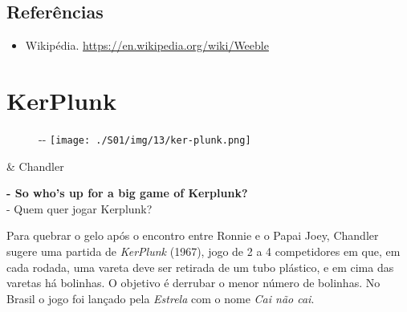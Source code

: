\hypertarget{referuxeancias}{%
\subsection{Referências}\label{referuxeancias}}

\begin{itemize}
\tightlist
\item
  \sloppy Wikipédia. \url{https://en.wikipedia.org/wiki/Weeble}
\end{itemize}

\hypertarget{kerplunk}{%
\section{KerPlunk}\label{kerplunk}}

\begin{figure}[!ht]
  \begin{adjustwidth}{-\oddsidemargin-1in}{-\rightmargin}
    \centering
    \texttt{[image: ./S01/img/13/ker-plunk.png]}
  \end{adjustwidth}
\end{figure}

\begin{tcolorbox}[enhanced,center upper,
    drop fuzzy shadow southeast, boxrule=0.3pt,
    lower separated=false,
    colframe=black!30!dialogoBorder,colback=white]
\begin{minipage}[c]{0.16\linewidth}
   & \centering \scriptsize{Chandler}
\end{minipage}
\hfill
\begin{minipage}[c]{0.8\linewidth}
  \textbf{- So who's up for a big game of Kerplunk?}\\
  - Quem quer jogar Kerplunk?
\end{minipage}
\end{tcolorbox}

Para quebrar o gelo após o encontro entre Ronnie e o Papai Joey,
Chandler sugere uma partida de \emph{KerPlunk} (1967), jogo de 2 a 4
competidores em que, em cada rodada, uma vareta deve ser retirada de um
tubo plástico, e em cima das varetas há bolinhas. O objetivo é derrubar
o menor número de bolinhas. No Brasil o jogo foi lançado pela
\emph{Estrela} com o nome \emph{Cai não cai}.

